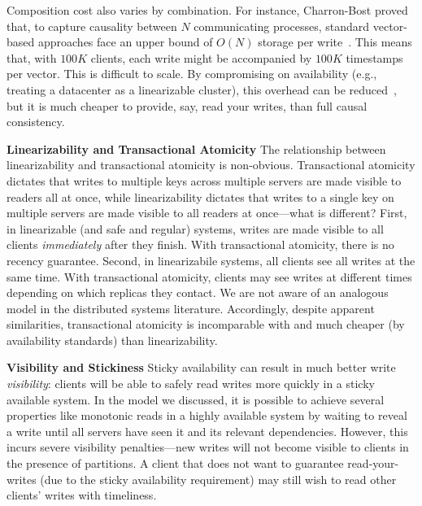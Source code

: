 Composition cost also varies by combination. For instance, Charron-Bost
 proved that, to capture causality between $N$ communicating
processes, standard vector-based approaches face an upper bound of
$O(N)$ storage per write~\cite{charron-bost}. This means that, with
$100K$ clients, each write might be accompanied by $100K$ timestamps
per vector. This is difficult to scale. By compromising on
availability (e.g., treating a datacenter as a linearizable cluster),
this overhead can be reduced~\cite{eiger}, but it is much
cheaper to provide, say, read your writes, than full causal
consistency.

\vspace{.5em}\noindent\textbf{Linearizability and Transactional
  Atomicity} The relationship between linearizability and
transactional atomicity is non-obvious. Transactional atomicity
dictates that writes to multiple keys across multiple servers are made
visible to readers all at once, while linearizability dictates that
writes to a single key on multiple servers are made visible to all
readers at once---what is different? First, in linearizable (and safe
and regular) systems, writes are made visible to all clients
\textit{immediately} after they finish. With transactional atomicity,
there is no recency guarantee. Second, in linearizabile systems, all
clients see all writes at the same time. With transactional atomicity,
clients may see writes at different times depending on which replicas
they contact. We are not aware of an analogous model in the
distributed systems literature. Accordingly, despite apparent
similarities, transactional atomicity is incomparable with and much
cheaper (by availability standards) than linearizability.

\vspace{.5em}\noindent\textbf{Visibility and Stickiness} Sticky
availability can result in much better write \textit{visibility}:
clients will be able to safely read writes more quickly in a sticky
available system. In the model we discussed, it is possible to achieve
several properties like monotonic reads in a highly available system
by waiting to reveal a write until all servers have seen it and its
relevant dependencies. However, this incurs severe visibility
penalties---new writes will not become visible to clients in the
presence of partitions. A client that does not want to guarantee
read-your-writes (due to the sticky availability requirement) may
still wish to read other clients' writes with timeliness.
